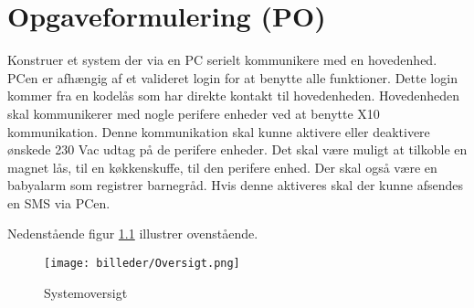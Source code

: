 \chapter{Opgaveformulering (PO)}


Konstruer et system der via en PC serielt kommunikere med en hovedenhed. PCen er afhængig af et valideret login for at benytte alle funktioner. Dette login kommer fra en kodelås som har direkte kontakt til hovedenheden. Hovedenheden skal kommunikerer med nogle perifere enheder ved at benytte X10 kommunikation. Denne kommunikation skal kunne aktivere eller deaktivere ønskede 230 Vac udtag på de perifere enheder. Det skal være muligt at tilkoble en magnet lås, til en køkkenskuffe, til den perifere enhed. Der skal også være en babyalarm som registrer barnegråd. Hvis denne aktiveres skal der kunne afsendes en SMS via PCen.

Nedenstående figur \ref{fig:Systemoversigt} illustrer ovenstående.

\begin{figure}[htbp]
  \centering
    \texttt{[image: billeder/Oversigt.png]}
    \caption{Systemoversigt}
    \label{fig:Systemoversigt}
\end{figure}